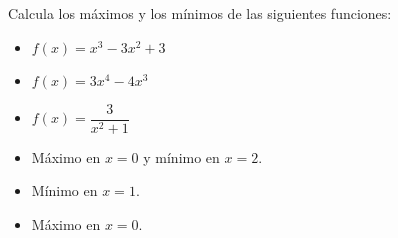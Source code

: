 \vspace{1cm}

\begin{ex}
	Calcula los máximos y los mínimos de las siguientes funciones:\\
	\begin{itemize}
		\item $f(x)=x^3-3x^2+3$
		\item $f(x)=3x^4-4x^3$
		\item $f(x)=\dfrac{3}{x^2+1}$
	\end{itemize}
	\begin{sol}
		\begin{itemize}
			\item Máximo en $x=0$ y mínimo en $x=2$.
			\item Mínimo en $x=1$.
			\item Máximo en $x=0$.
		\end{itemize}
	\end{sol}
\end{ex}
